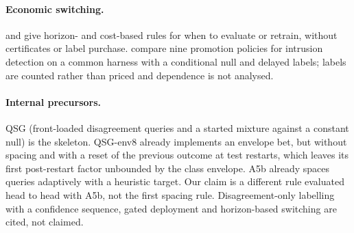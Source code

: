 \paragraph{Economic switching.} \citet{digalakis2025challenger} and \citet{regol2025when} give
horizon- and cost-based rules for when to evaluate or retrain, without certificates or label purchase.
\citet{fernandez2026promotion} compare nine promotion policies for intrusion detection on a common
harness with a conditional null and delayed labels; labels are counted rather than priced and
dependence is not analysed.

\paragraph{Internal precursors.} QSG (front-loaded disagreement queries and a started mixture against
a constant null) is the skeleton. QSG-env8 already implements an envelope bet, but without spacing and
with a reset of the previous outcome at test restarts, which leaves its first post-restart factor
unbounded by the class envelope. A5b already spaces queries adaptively with a heuristic target.
Our claim is a different rule evaluated head to head with A5b, not the first spacing rule.
Disagreement-only labelling with a confidence sequence, gated deployment and horizon-based switching
are cited, not claimed.
